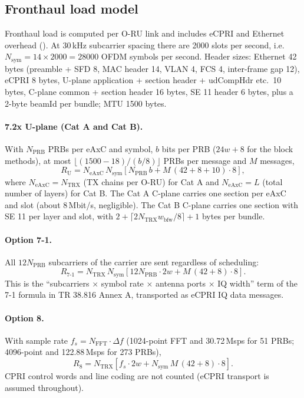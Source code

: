 \documentclass[11pt,a4paper]{article}
\DeclareRobustCommand{\code}[1]{\codeurl{#1}}  %
\begin{document}
\subsection{Fronthaul load model}
\label{sec:load}

Fronthaul load is computed per O-RU link and includes eCPRI and Ethernet overhead (\code{oran/fronthaul.py}). At 30\,kHz
subcarrier spacing there are 2000 slots per second, i.e.\ $N_{\mathrm{sym}} = 14 \times 2000 = 28000$ OFDM symbols per second.
Header sizes: Ethernet 42 bytes (preamble + SFD 8, MAC header 14, VLAN 4, FCS 4, inter-frame gap 12), eCPRI 8 bytes, U-plane
application + section header + udCompHdr etc.\ 10 bytes, C-plane common + section header 16 bytes, SE 11 header 6 bytes, plus a
2-byte beamId per bundle; MTU 1500 bytes.

\paragraph{7.2x U-plane (Cat A and Cat B).} With $N_{\mathrm{PRB}}$ PRBs per eAxC and symbol, $b$ bits per PRB ($24w+8$ for the
block methods), at most $\lfloor (1500-18)/(b/8) \rfloor$ PRBs per message and $M$ messages,
\begin{equation}
  R_{\mathrm{U}} = N_{\mathrm{eAxC}} \, N_{\mathrm{sym}} \left[ N_{\mathrm{PRB}}\, b + M \,(42+8+10)\cdot 8 \right],
\end{equation}
where $N_{\mathrm{eAxC}} = N_{\mathrm{TRX}}$ (TX chains per O-RU) for Cat A and $N_{\mathrm{eAxC}} = L$ (total number of layers)
for Cat B. The Cat A C-plane carries one section per eAxC and slot (about 8\,Mbit/s, negligible). The Cat B C-plane carries one
section with SE 11 per layer and slot, with $2 + \lceil 2 N_{\mathrm{TRX}} w_{\mathrm{bfw}} / 8 \rceil + 1$ bytes per bundle.

\paragraph{Option 7-1.} All $12 N_{\mathrm{PRB}}$ subcarriers of the carrier are sent regardless of scheduling:
\begin{equation}
  R_{7\text{-}1} = N_{\mathrm{TRX}} \, N_{\mathrm{sym}} \left[ 12 N_{\mathrm{PRB}} \cdot 2w + M\,(42+8)\cdot 8 \right].
\end{equation}
This is the ``subcarriers $\times$ symbol rate $\times$ antenna ports $\times$ IQ width'' term of the 7-1 formula in TR 38.816
Annex A, transported as eCPRI IQ data messages.

\paragraph{Option 8.} With sample rate $f_s = N_{\mathrm{FFT}} \cdot \Delta f$ (1024-point FFT and 30.72\,Msps for 51 PRBs;
4096-point and 122.88\,Msps for 273 PRBs),
\begin{equation}
  R_{8} = N_{\mathrm{TRX}} \left[ f_s \cdot 2w + N_{\mathrm{sym}}\, M\,(42+8)\cdot 8 \right].
\end{equation}
CPRI control words and line coding are not counted (eCPRI transport is assumed throughout).
\end{document}
